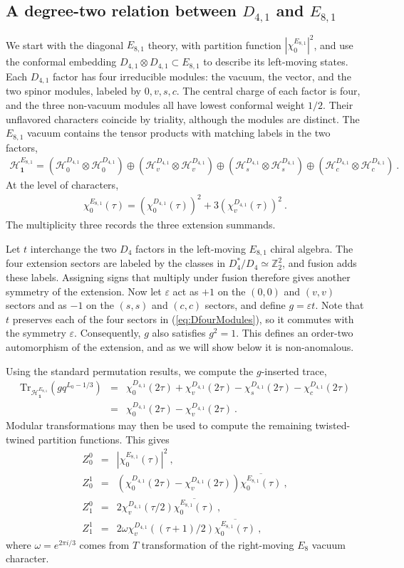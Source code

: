\documentclass[12pt]{article}
\numberwithin{equation}{section}
\newcommand{\bea}{\begin{eqnarray}}
\newcommand{\eea}{\end{eqnarray}}
\def\no{\nonumber}
\def\ZZ{\mathbb{Z}}
\newcommand{\Tr}{\mathrm{Tr}}
\theoremstyle{remark}
\begin{document}
\subsection{A degree-two relation between $D_{4,1}$ and $E_{8,1}$}
\label{sec:DfourEeight}


We start with the diagonal $E_{8,1}$ theory, with partition function $|\chi^{E_{8,1}}_0|^2$, and use the conformal embedding $D_{4,1}\otimes D_{4,1}\subset E_{8,1}$ to describe its left-moving states. Each $D_{4,1}$ factor has four irreducible modules: the vacuum, the vector, and the two spinor modules, labeled by $0,v,s,c$. The central charge of each factor is four, and the three non-vacuum modules all have lowest conformal weight $1/2$. Their unflavored characters coincide by triality, although the modules are distinct. The $E_{8,1}$ vacuum contains the tensor products with matching labels in the two factors,
\bea \label{eq:DfourModules}
\mathcal H^{E_{8,1}}_{\mathbf1}=\left(\mathcal H^{D_{4,1}}_0\otimes\mathcal H^{D_{4,1}}_0\right)\oplus\left(\mathcal H^{D_{4,1}}_v\otimes\mathcal H^{D_{4,1}}_v\right)\oplus\left(\mathcal H^{D_{4,1}}_s\otimes\mathcal H^{D_{4,1}}_s\right)\oplus\left(\mathcal H^{D_{4,1}}_c\otimes\mathcal H^{D_{4,1}}_c\right)~.
\eea
At the level of characters,
\bea
\chi^{E_{8,1}}_0(\tau)=\left(\chi^{D_{4,1}}_0(\tau)\right)^2+3\left(\chi^{D_{4,1}}_v(\tau)\right)^2~.
\eea
The multiplicity three records the three extension summands.

Let $t$ interchange the two $D_4$ factors in the left-moving $E_{8,1}$ chiral algebra. The four extension sectors are labeled by the classes in $D_4^*/D_4\simeq\ZZ_2^2$, and fusion adds these labels. Assigning signs that multiply under fusion therefore gives another symmetry of the extension. Now let $\varepsilon$ act as $+1$ on the $(0,0)$ and $(v,v)$ sectors and as $-1$ on the $(s,s)$ and $(c,c)$ sectors, and define $g=\varepsilon t$. Note that $t$ preserves each of the four sectors in (\ref{eq:DfourModules}), so it commutes with the symmetry $\varepsilon$. Consequently, $g$ also satisfies $g^2=1$. This defines an order-two automorphism of the extension, and as we will show below it is non-anomalous. 

Using the standard permutation results, we compute the $g$-inserted trace,
\bea
\Tr_{\mathcal H^{E_{8,1}}_{\mathbf1}}\left(gq^{L_0-1/3}\right)&=&\chi^{D_{4,1}}_0(2\tau)+\chi^{D_{4,1}}_v(2\tau)-\chi^{D_{4,1}}_s(2\tau)-\chi^{D_{4,1}}_c(2\tau)\no\\
&=&\chi^{D_{4,1}}_0(2\tau)-\chi^{D_{4,1}}_v(2\tau)~.
\eea
Modular transformations may then be used to compute the remaining twisted-twined partition functions. 
This gives
\bea \label{eq:DfourBlocks}
Z^0_0&=&\left|\chi^{E_{8,1}}_0(\tau)\right|^2~,\no\\
Z^1_0&=&\left(\chi^{D_{4,1}}_0(2\tau)-\chi^{D_{4,1}}_v(2\tau)\right)\overline{\chi^{E_{8,1}}_0(\tau)}~,\no\\
Z^0_1&=&2\chi^{D_{4,1}}_v(\tau/2)\overline{\chi^{E_{8,1}}_0(\tau)}~,\no\\
Z^1_1&=&2\omega\chi^{D_{4,1}}_v\left((\tau+1)/2\right)\overline{\chi^{E_{8,1}}_0(\tau)}~,
\eea
where $\omega=e^{2\pi i/3}$ comes from $T$ transformation of the right-moving $E_8$ vacuum character.
\end{document}
